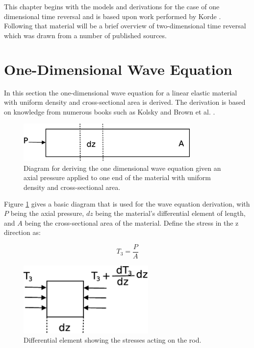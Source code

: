 This chapter begins with the models and derivations for the case of one dimensional time reversal and is based upon work performed by Korde \cite{Fehrman2012}. Following that material will be a brief overview of two-dimensional time reversal which was drawn from a number of published sources.

\section{One-Dimensional Wave Equation}
\label{sec:oneDWaveEquation}

In this section the one-dimensional wave equation for a linear elastic material with uniform density and cross-sectional area is derived. The derivation is based on knowledge from numerous books such as Kolsky \cite{Kolsky1963} and Brown et al. \cite{Brown2008}.

\begin{figure}[ht!]
\centering
\includegraphics[width=0.8\textwidth]{eps_pics/deriveWaveRod}
\caption{Diagram for deriving the one dimensional wave equation given an axial pressure applied to one end of the material with uniform density and cross-sectional area.
	 \label{fig:deriveWaveRod}} 
\end{figure}

Figure \ref{fig:deriveWaveRod} gives a basic diagram that is used for the wave equation derivation, with $P$ being the axial pressure, $dz$ being the material's differential element of length, and $A$ being the cross-sectional area of the material. Define the stress in the z direction as:

\begin{equation}
T_3 = \frac{P}{A}
\end{equation}


\begin{figure}[ht!]
\centering
\includegraphics[width=0.6\textwidth]{eps_pics/diffElementRod}
\caption{Differential element showing the stresses acting on the rod.
	 \label{fig:diffElementRod}} 
\end{figure}

